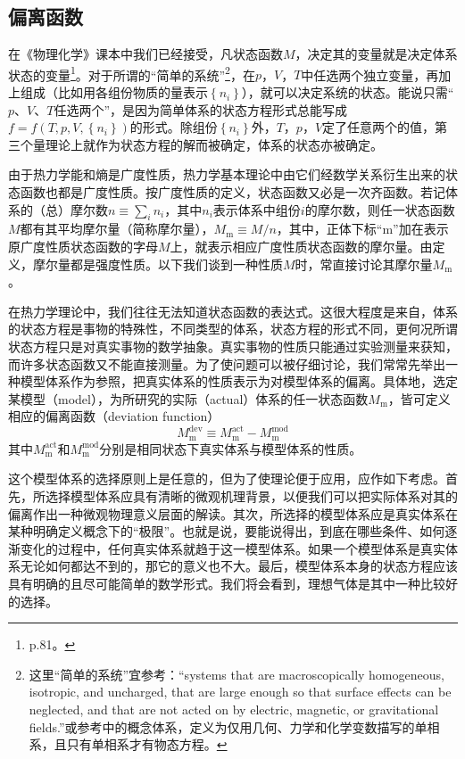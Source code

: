 \documentclass[main.tex]{subfiles}
\begin{document}
\subsection{偏离函数}
在《物理化学》课本中我们已经接受，凡状态函数$M$，决定其的变量就是决定体系状态的变量\footnote{p.81。}。对于所谓的“简单的系统”\footnote{这里“简单的系统”宜参考\cite[p.9]{Callen1985}：“systems that are macroscopically homogeneous, isotropic, and uncharged, that are large enough so that surface effects can be neglected, and that are not acted on by electric, magnetic, or gravitational fields.”或参考\cite[p.17]{王竹溪1960}中的概念体系，定义为仅用几何、力学和化学变数描写的单相系，且只有单相系才有物态方程。}，在$p$，$V$，$T$中任选两个独立变量，再加上组成（比如用各组份物质的量表示$\left\{n_i\right\}$），就可以决定系统的状态。能说只需“$p$、$V$、$T$任选两个”，是因为简单体系的状态方程形式总能写成$f=f\left(T,p,V,\left\{n_i\right\}\right)$的形式。除组份$\left\{n_i\right\}$外，$T$，$p$，$V$定了任意两个的值，第三个量理论上就作为状态方程的解而被确定，体系的状态亦被确定。

由于热力学能和熵是广度性质，热力学基本理论中由它们经数学关系衍生出来的状态函数也都是广度性质。按广度性质的定义，状态函数又必是一次齐函数\cite[p.75]{傅献彩2022I}。若记体系的（总）摩尔数$n\equiv\sum_i n_i$，其中$n_i$表示体系中组份$i$的摩尔数，则任一状态函数$M$都有其平均摩尔量（简称摩尔量），$M_\text{m}\equiv M/n$，其中，正体下标“m”加在表示原广度性质状态函数的字母$M$上，就表示相应广度性质状态函数的摩尔量。由定义，摩尔量都是强度性质。以下我们谈到一种性质$M$时，常直接讨论其摩尔量$M_\text{m}$。

在热力学理论中，我们往往无法知道状态函数的表达式。这很大程度是来自，体系的状态方程是事物的特殊性，不同类型的体系，状态方程的形式不同，更何况所谓状态方程只是对真实事物的数学抽象。真实事物的性质只能通过实验测量来获知，而许多状态函数又不能直接测量。为了使问题可以被仔细讨论，我们常常先举出一种模型体系作为参照，把真实体系的性质表示为对模型体系的偏离。具体地，选定某模型（model），为所研究的实际（actual）体系的任一状态函数$M_\text{m}$，皆可定义相应的偏离函数（deviation function）
\[M^\text{dev}_\text{m}\equiv M^\text{act}_\text{m}-M^\text{mod}_\text{m}\]
其中$M^\text{act}_\text{m}$和$M^\text{mod}_\text{m}$分别是相同状态下真实体系与模型体系的性质。

这个模型体系的选择原则上是任意的，但为了使理论便于应用，应作如下考虑。首先，所选择模型体系应具有清晰的微观机理背景，以便我们可以把实际体系对其的偏离作出一种微观物理意义层面的解读。其次，所选择的模型体系应是真实体系在某种明确定义概念下的“极限”。也就是说，要能说得出，到底在哪些条件、如何逐渐变化的过程中，任何真实体系就趋于这一模型体系。如果一个模型体系是真实体系无论如何都达不到的，那它的意义也不大。最后，模型体系本身的状态方程应该具有明确的且尽可能简单的数学形式。我们将会看到，理想气体是其中一种比较好的选择。
\end{document}
